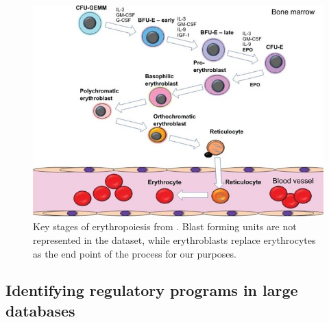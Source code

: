 \begin{figure}
  \centering
  \includegraphics[width=\textwidth]{plot/ch4/ery}
  \caption[Erythropoiesis schematic]{Key stages of erythropoiesis from \textcite{Sinclair2013}. Blast forming units are not represented in the \textcite{Ludwig2019} dataset, while erythroblasts replace erythrocytes as the end point of the process for our purposes.}
  \label{fig:ery}
\end{figure}


\subsection{Identifying regulatory programs in large databases}

